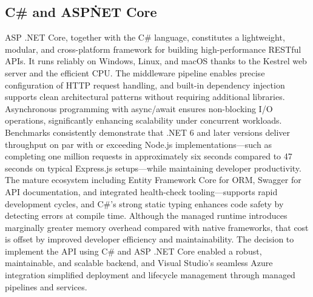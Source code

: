 \subsection{C\# and ASP\.NET Core}
ASP .NET Core, together with the C\# language, constitutes a lightweight, modular, and cross-platform framework for building high-performance RESTful APIs. It runs reliably on Windows, Linux, and macOS thanks to the Kestrel web server and the efficient \ac{CPU}. The middleware pipeline enables precise configuration of HTTP request handling, and built-in dependency injection supports clean architectural patterns without requiring additional libraries. Asynchronous programming with async/await ensures non-blocking I/O operations, significantly enhancing scalability under concurrent workloads. Benchmarks consistently demonstrate that .NET 6 and later versions deliver throughput on par with or exceeding Node.js implementations—such as completing one million requests in approximately six seconds compared to 47 seconds on typical Express.js setups—while maintaining developer productivity. The mature ecosystem including Entity Framework Core for ORM, Swagger for API documentation, and integrated health-check tooling—supports rapid development cycles, and C\#’s strong static typing enhances code safety by detecting errors at compile time. Although the managed runtime introduces marginally greater memory overhead compared with native frameworks, that cost is offset by improved developer efficiency and maintainability. The decision to implement the API using C\# and ASP .NET Core enabled a robust, maintainable, and scalable backend, and Visual Studio’s seamless Azure integration simplified deployment and lifecycle management through managed pipelines and services.

